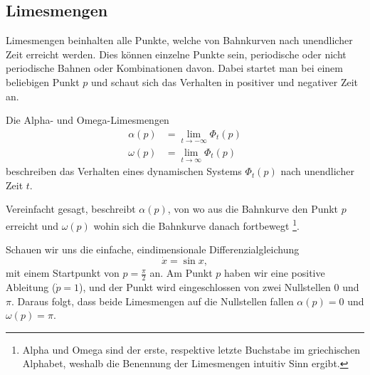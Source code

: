 \subsection{Limesmengen} \label{poinbendix:subsection:limesmengen}

Limesmengen beinhalten alle Punkte, welche von Bahnkurven nach unendlicher Zeit erreicht werden.
Dies können einzelne Punkte sein, periodische oder nicht periodische Bahnen oder Kombinationen davon.
Dabei startet man bei einem beliebigen Punkt $p$ und schaut sich das Verhalten in positiver und negativer Zeit an.

\begin{definition}[Limesmengen]
Die Alpha- und Omega-Limesmengen
\label{poinbendix:def:limesmengen}
\begin{align*}
    \alpha(p) &= \lim_{t\to-\infty} \Phi_t(p) \\
    \omega(p) &= \lim_{t\to\infty} \Phi_t(p)
\end{align*}
beschreiben das Verhalten eines dynamischen Systems $\Phi_t(p)$ nach unendlicher Zeit $t$.
\end{definition}

Vereinfacht gesagt, beschreibt $\alpha(p)$, von wo aus die Bahnkurve den Punkt $p$ erreicht und $\omega(p)$ wohin sich die Bahnkurve danach fortbewegt
\footnote{Alpha und Omega sind der erste, respektive letzte Buchstabe im griechischen Alphabet, weshalb die Benennung der Limesmengen intuitiv Sinn ergibt.}.

\begin{beispiel} \label{poinbendix:beispiel:1dlimesmengen}
Schauen wir uns die einfache, eindimensionale Differenzialgleichung
\begin{equation*}
    \dot{x} = \sin x,
\end{equation*}
mit einem Startpunkt von $p = \frac{\pi}{2}$ an.
Am Punkt $p$ haben wir eine positive Ableitung ($\dot{p} = 1$), und der Punkt wird eingeschlossen von zwei Nullstellen $0$ und $\pi$.
Daraus folgt, dass beide Limesmengen auf die Nullstellen fallen $\alpha(p) = 0$ und $\omega(p) = \pi$.
\end{beispiel}
